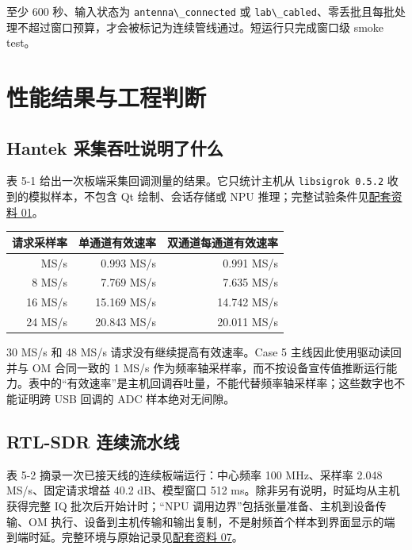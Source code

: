 至少 600 秒、输入状态为 \passthrough{\lstinline!antenna\_connected!} 或
\passthrough{\lstinline!lab\_cabled!}、零丢批且每批处理不超过窗口预算，才会被标记为连续管线通过。短运行只完成窗口级
smoke test。

\section{性能结果与工程判断}\label{src-experiment-case5-performance}

\subsection{Hantek
采集吞吐说明了什么}\label{src-experiment-case5-hantek-throughput}

表 5-1 给出一次板端采集回调测量的结果。它只统计主机从
\passthrough{\lstinline!libsigrok 0.5.2!} 收到的模拟样本，不包含 Qt
绘制、会话存储或 NPU
推理；完整试验条件见\href{https://github.com/zhouxzh/Ascend310/blob/main/samples/case5/docs/01_hantek6022be.md}{配套资料
01}。

\begin{longtable}[]{@{}rrr@{}}
\toprule\noalign{}
请求采样率 & 单通道有效速率 & 双通道每通道有效速率 \\
\midrule\noalign{}
\endhead
\bottomrule\noalign{}
\endlastfoot
1 MS/s & 0.993 MS/s & 0.991 MS/s \\
8 MS/s & 7.769 MS/s & 7.635 MS/s \\
16 MS/s & 15.169 MS/s & 14.742 MS/s \\
24 MS/s & 20.843 MS/s & 20.011 MS/s \\
\end{longtable}

30 MS/s 和 48 MS/s 请求没有继续提高有效速率。Case 5
主线因此使用驱动读回并与 OM 合同一致的 1 MS/s
作为频率轴采样率，而不按设备宣传值推断运行能力。表中的``有效速率''是主机回调吞吐量，不能代替频率轴采样率；这些数字也不能证明跨
USB 回调的 ADC 样本绝对无间隙。

\subsection{RTL-SDR 连续流水线}\label{src-experiment-case5-rtl-soak}

表 5-2 摘录一次已接天线的连续板端运行：中心频率 100 MHz、采样率 2.048
MS/s、固定请求增益 40.2 dB、模型窗口 512
ms。除非另有说明，时延均从主机获得完整 IQ 批次后开始计时；``NPU
调用边界''包括张量准备、主机到设备传输、OM
执行、设备到主机传输和输出复制，不是射频首个样本到界面显示的端到端时延。完整环境与原始记录见\href{https://github.com/zhouxzh/Ascend310/blob/main/samples/case5/docs/07_ascend310b_heterogeneous_signal_processing.md}{配套资料
07}。


